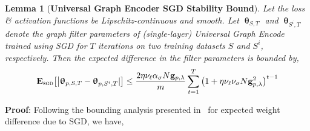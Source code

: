 \documentclass{article}
\newtheorem{lemma}{Lemma}
\begin{document}
\begin{lemma}[\textbf{Universal Graph Encoder    SGD Stability Bound}]\label{lemma:sgd_terms} \textit{ Let the loss \& activation functions be  Lipschitz-continuous and smooth. Let $\bm{\uptheta}_{S,T}$ and $\bm{\uptheta}_{S^i,T}$ denote the graph filter parameters of (single-layer)  Universal Graph Encode	 trained using SGD for $T$ iterations on two training datasets  $S$ and $S^{i}$, respectively. Then the expected difference in   the filter  parameters  is bounded by,}
	$$ \mathbf{E}_{\textsc{sgd}}  \big[\big| \bm{\uptheta}_{p, S,T} -\bm{\uptheta}_{p, S^i,T}  | \big]   \leq    \frac{2\eta \nu_{\ell} \alpha_{\sigma}  N\mathbf{g}_{p, \lambda}  }{m}  \sum_{t=1}^{T} \big( 1 + \eta\nu_{\ell}  \nu_{\sigma} N\mathbf{g}_{p, \lambda}^2 \big)^{t-1}  $$
\end{lemma}
\noindent \textbf{Proof}: Following the bounding analysis presented in~\cite{verma2019stability} for expected weight difference due to SGD, we have,
\end{document}
